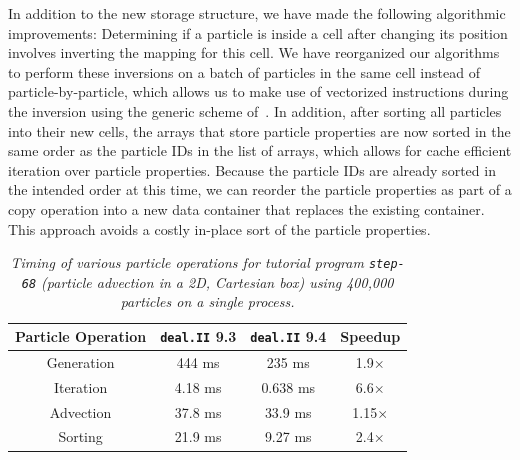 \documentclass{ansarticle-preprint}
\newcommand{\specialword}[1]{\texttt{#1}}
\newcommand{\dealii}{{\specialword{deal.II}}\xspace}
\begin{document}
In addition to the new storage structure, we have made the following algorithmic improvements:
Determining if a particle is inside a cell after changing its position involves inverting the mapping for this cell. We have reorganized our algorithms to perform these inversions on a batch of particles in the same cell instead of particle-by-particle, which allows us to make use of vectorized instructions during the inversion using the generic scheme of~\cite{KronbichlerKormann2012}.
In addition, after sorting all particles into their new cells, the arrays that store particle properties are now sorted in the same order as the particle IDs in the list of arrays, which allows for cache efficient iteration over particle properties.
Because the particle IDs are already sorted in the intended order at this time, we can reorder the particle properties as part of a copy operation into a new data container that replaces the existing container. This approach avoids a costly in-place sort of the particle properties.

\begin{table}
  \caption{\it Timing of various particle operations for tutorial program \texttt{step-68} (particle advection in a 2D, Cartesian box) using 400,000 particles on a single process.}
  \label{tab:particle_timing}

  \centering
  \begin{tabular}{|c|c|c|c|}
    \hline
   Particle Operation & \dealii 9.3 & \dealii 9.4 & Speedup \\
   \hline
   Generation & 444 ms & 235 ms & 1.9$\times$ \\
   Iteration & 4.18 ms & 0.638 ms & 6.6$\times$ \\
   Advection & 37.8 ms & 33.9 ms & 1.15$\times$ \\
   Sorting & 21.9 ms & 9.27 ms & 2.4$\times$ \\
   \hline
  \end{tabular}
  \end{table}
\end{document}
